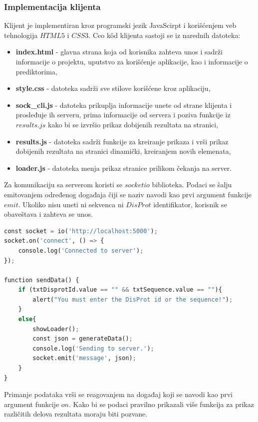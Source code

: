 \subsubsection{Implementacija klijenta}
Klijent je implementiran kroz programski jezik JavaScirpt i korišćenjem veb tehnologija $HTML5$ i $CSS3$. 
Ceo kôd klijenta sastoji se iz narednih datoteka:
\begin{itemize}
\item \textbf{index.html} - glavna strana koja od korisnika zahteva unos i sadrži informacije o projektu, uputstvo za korišćenje aplikacije, kao i informacije o prediktorima,
\item \textbf{style.css} - datoteka sadrži sve stilove korišćene kroz aplikaciju,
\item \textbf{sock\_cli.js} - datoteka prikuplja informacije unete od strane klijenta i prosleđuje ih serveru, prima informacije od servera i poziva funkcije iz $results.js$ kako bi se izvršio prikaz dobijenih rezultata na stranici,
\item \textbf{results.js} - datoteka sadrži funkcije za kreiranje prikaza i vrši prikaz dobijenih rezultata na stranici dinamički, kreiranjem novih elemenata, 
\item \textbf{loader.js} - datoteka menja prikaz stranice prilikom čekanja na server.
\end{itemize}

Za komunikaciju sa serverom koristi se $socketio$ biblioteka. Podaci se šalju emitovanjem određenog događaja čiji se naziv navodi kao prvi argument funkcije $emit$. Ukoliko nisu uneti ni sekvenca ni $DisProt$ identifikator, korisnik se obaveštava i zahteva se unos.
\begin{lstlisting}[language=Python]
const socket = io('http://localhost:5000');
socket.on('connect', () => {
    console.log('Connected to server');
});

function sendData() {
    if (txtDisprotId.value == "" && txtSequence.value == ""){
        alert("You must enter the DisProt id or the sequence!");
    }
    else{
        showLoader();
        const json = generateData();
        console.log('Sending to server.');
        socket.emit('message', json);
    }
}
\end{lstlisting}

Primanje podataka vrši se reagovanjem na događaj koji se navodi kao prvi argument funkcije $on$. Kako bi se podaci pravilno prikazali više funkcija za prikaz različitih delova rezultata moraju biti pozvane.\\

